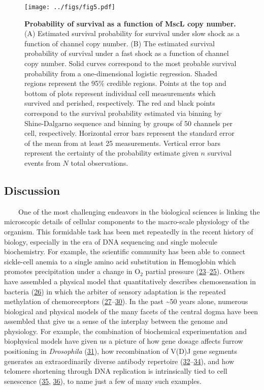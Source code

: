 \begin{figure}
\centering
\texttt{[image: ../figs/fig5.pdf]}
\caption{\textbf{Probability
of
survival
as a
function
of
MscL
copy
number.}
(A)
Estimated
survival
probability
for
survival
under
slow
shock
as a
function
of
channel
copy
number.
(B)
The
estimated
survival
probability
of
survival
under
a fast
shock
as a
function
of
channel
copy
number.
Solid
curves
correspond
to the
most
probable
survival
probability
from a
one-dimensional
logistic
regression.
Shaded
regions
represent
the
95\%
credible
regions.
Points
at the
top
and
bottom
of
plots
represent
individual
cell
measurements
which
survived
and
perished,
respectively.
The
red
and
black
points
correspond
to the
survival
probability
estimated
via
binning
by
Shine-Dalgarno
sequence
and
binning
by
groups
of 50
channels
per
cell,
respectively.
Horizontal
error
bars
represent
the
standard
error
of the
mean
from
at
least
25
measurements.
Vertical
error
bars
represent
the
certainty
of the
probability
estimate
given
\(n\)
survival
events
from
\(N\)
total
observations.}\label{fig:survival}
\end{figure}

\subsection{Discussion}\label{discussion}

~~~~One
of the
most
challenging
endeavors
in the
biological
sciences
is
linking
the
microscopic
details
of
cellular
components
to the
macro-scale
physiology
of the
organism.
This
formidable
task
has
been
met
repeatedly
in the
recent
history
of
biology,
especially
in the
era of
DNA
sequencing
and
single
molecule
biochemistry.
For
example,
the
scientific
community
has
been
able
to
connect
sickle-cell
anemia
to a
single
amino
acid
substitution
in
Hemoglobin
which
promotes
precipitation
under
a
change
in
O\(_2\)
partial
pressure
(\protect\hyperlink{ref-feeling-taylor2004}{23}--\protect\hyperlink{ref-perutz1950}{25}).
Others
have
assembled
a
physical
model
that
quantitatively
describes
chemosensation
in
bacteria
(\protect\hyperlink{ref-berg1977}{26})
in
which
the
arbiter
of
sensory
adaptation
is the
repeated
methylation
of
chemoreceptors
(\protect\hyperlink{ref-colin2017}{27}--\protect\hyperlink{ref-sourjik2002}{30}).
In the
past
\textasciitilde{}50
years
alone,
numerous
biological
and
physical
models
of the
many
facets
of the
central
dogma
have
been
assembled
that
give
us a
sense
of the
interplay
between
the
genome
and
physiology.
For
example,
the
combination
of
biochemical
experimentation
and
biophysical
models
have
given
us a
picture
of how
gene
dosage
affects
furrow
positioning
in
\emph{Drosophila}
(\protect\hyperlink{ref-liu2013}{31}),
how
recombination
of
V(D)J
gene
segments
generates
an
extraordinarily
diverse
antibody
repertoire
(\protect\hyperlink{ref-lovely2015}{32}--\protect\hyperlink{ref-schatz2011}{34}),
and
how
telomere
shortening
through
DNA
replication
is
intrinsically
tied
to
cell
senescence
(\protect\hyperlink{ref-herbig2004}{35},
\protect\hyperlink{ref-victorelli2017}{36}),
to
name
just a
few of
many
such
examples.

